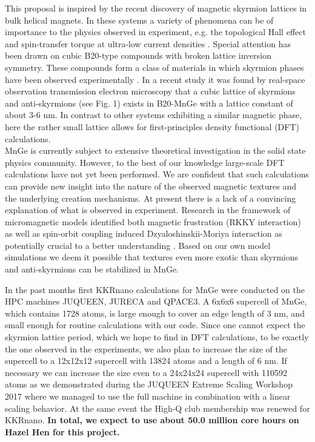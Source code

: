 \documentclass [a4paper, 12pt]{article}
\begin{document}
This proposal is inspired by the recent discovery of magnetic skyrmion lattices in bulk helical magnets.
In these systems a variety of phenomena can be of importance to the physics observed in experiment,
e.g. the topological Hall effect and spin-transfer torque at ultra-low current densities
\cite{kanazawa_large_2011}.
Special attention has been drawn on cubic B20-type compounds with broken lattice inversion symmetry.
These compounds form a class of materials in which skyrmion phases have been observed experimentally
\cite{nagaosa_topological_2013}.
In a recent study \cite{tanigaki_real-space_2015} 
it was found by real-space observation transmission electron microscopy 
that a cubic lattice of skyrmions and anti-skyrmions (see Fig. 1) exists in B20-MnGe with
a lattice constant of about 3-6 nm. In contrast to other systems exhibiting a similar magnetic phase,
here the rather small lattice allows for first-principles density functional (DFT) calculations. 
\\
MnGe is currently subject to extensive theoretical investigation in the solid state physics community.
However, to the best of our knowledge large-scale DFT calculations have not yet been performed.
We are confident that such calculations can provide new insight into the nature of
the observed magnetic textures and the underlying creation mechanisms.
At present there is a lack of a convincing explanation of what is observed in experiment. 
Research in the framework of micromagnetic models identified both magnetic frustration (RKKY interaction) 
as well as spin-orbit coupling induced Dzyaloshinskii-Moriya interaction as potentially
crucial to a better understanding \cite{koretsune_control_2015,altynbaev_hidden_2016}.
Based on our own model simulations we deem it
possible that textures even more exotic than skyrmions and anti-skyrmions \cite{rybakov_new_2015}
can be stabilized in MnGe.

In the past months first KKRnano calculations for MnGe were conducted on the HPC machines JUQUEEN,
JURECA and QPACE3. A 6x6x6 supercell of MnGe, which contains 1728 atoms, is large enough to cover 
an edge length of 3 nm, and small enough for routine calculations with our code. Since one cannot 
expect the skyrmion lattice period, which we hope to find in DFT calculations, to be exactly the 
one observed in the experiments, we also plan to increase the size of the supercell to a 12x12x12
supercell with 13824 atoms and a length of 6 nm. If necessary we can increase the size even
to a 24x24x24 supercell with 110592 atoms as we demonstrated during the
JUQUEEN Extreme Scaling Workshop 2017 \cite{brommel_juqueen_2017}
where we managed to use the full machine in combination 
with a linear scaling behavior.
At the same event the High-Q club membership was renewed for KKRnano.
\textbf{In total, we expect to use about 50.0 million core hours on Hazel Hen for this project.}
\end{document}
